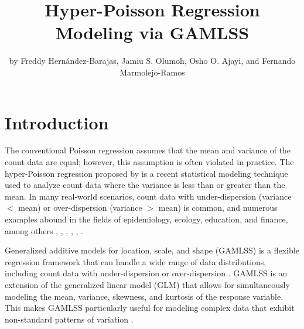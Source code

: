 \title{Hyper-Poisson Regression Modeling via GAMLSS}


\author{by Freddy Hernández-Barajas, Jamiu S. Olumoh, Osho O. Ajayi, and Fernando Marmolejo-Ramos}

\maketitle


\section{Introduction}\label{introduction}

The conventional Poisson regression assumes that the mean and variance of the count data are equal; however, this assumption is often violated in practice. The hyper-Poisson regression proposed by \citet{Saez13} is a recent statistical modeling technique used to analyze count data where the variance is less than or greater than the mean. In many real-world scenarios, count data with under-dispersion (variance \(<\) mean) or over-dispersion (variance \(>\) mean) is common, and numerous examples abound in the fields of epidemiology, ecology, education, and finance, among others \citet{Cameron1988Microeconomics}, \citet{Consul1989}, \citet{Winkelmann1991}, \citet{Famoye1993}, \citet{johnson2005}, \citet{Sellers2012}.

Generalized additive models for location, scale, and shape (GAMLSS) is a flexible regression framework that can handle a wide range of data distributions, including count data with under-dispersion or over-dispersion \citet{Stasinopoulos2008}. GAMLSS is an extension of the generalized linear model (GLM) that allows for simultaneously modeling the mean, variance, skewness, and kurtosis of the response variable. This makes GAMLSS particularly useful for modeling complex data that exhibit non-standard patterns of variation \citet{peluso2019discrete}.

